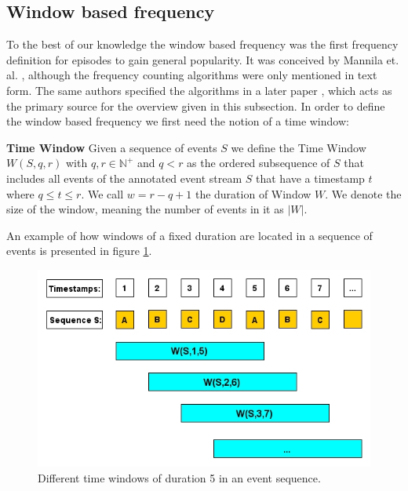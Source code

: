 \subsection{Window based frequency}
\label{subsec_windowBased}
To the best of our knowledge the window based frequency was the first frequency definition for episodes to gain general popularity. It was conceived by Mannila et. al. \cite{mannila1995discovering}, although the frequency counting algorithms were only mentioned in text form. The same authors  specified the algorithms in a later paper \cite{mannila1997discovery}, which acts as the primary source for the overview given in this subsection. In order to define the window based frequency we first need the notion of a time window: 

\begin{mydef}
\label{def_timeWindow}
\textbf{Time Window} Given a sequence of events $S$ we define the Time Window $W(S,q,r)$ with $q,r \in \mathbb{N}^+$ and $q < r$ as the ordered subsequence of $S$ that includes all events of the annotated event stream $S$ that have a timestamp $t$ where $q \leq t\leq r$. We call $w = r-q+1$ the duration of Window $W$. We denote the size of the window, meaning the number of events in it as $|W|$.
\end{mydef}

An example of how windows of a fixed duration are located in a sequence of events is presented in figure \ref{fig_windowBasedFrequency}.

\begin{figure}[h]
	\centering
  	\includegraphics[width=\textwidth]{windowBasedFrequency}
	\caption{Different time windows of duration 5 in an event sequence.}
	\label{fig_windowBasedFrequency}
\end{figure}


